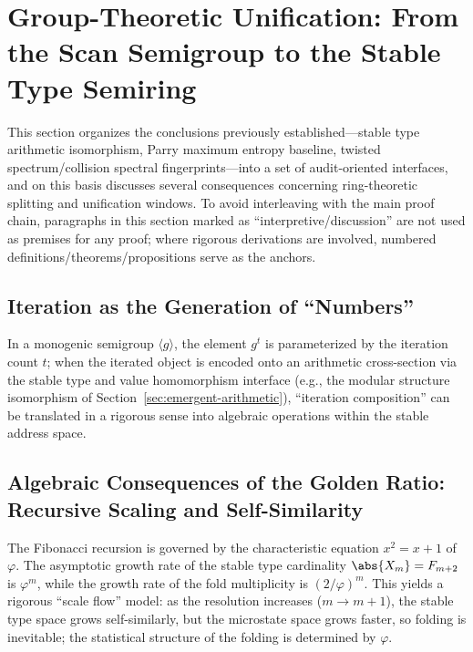 \section{Group-Theoretic Unification: From the Scan Semigroup to the Stable Type Semiring}\label{sec:group-unification}

This section organizes the conclusions previously established---stable type arithmetic isomorphism, Parry maximum entropy baseline, twisted spectrum/collision spectral fingerprints---into a set of audit-oriented interfaces, and on this basis discusses several consequences concerning ring-theoretic splitting and unification windows. To avoid interleaving with the main proof chain, paragraphs in this section marked as ``interpretive/discussion'' are not used as premises for any proof; where rigorous derivations are involved, numbered definitions/theorems/propositions serve as the anchors.

\subsection{Iteration as the Generation of ``Numbers''}

In a monogenic semigroup \(\langle g\rangle\), the element \(g^t\) is parameterized by the iteration count \(t\); when the iterated object is encoded onto an arithmetic cross-section via the stable type and value homomorphism interface (e.g., the modular structure isomorphism of Section~\ref{sec:emergent-arithmetic}), ``iteration composition'' can be translated in a rigorous sense into algebraic operations within the stable address space.

\subsection{Algebraic Consequences of the Golden Ratio: Recursive Scaling and Self-Similarity}

The Fibonacci recursion is governed by the characteristic equation $x^2=x+1$ of $\varphi$. The asymptotic growth rate of the stable type cardinality $\abs{X_m}=F_{m+2}$ is $\varphi^m$, while the growth rate of the fold multiplicity is $(2/\varphi)^m$. This yields a rigorous ``scale flow'' model: as the resolution increases ($m\to m+1$), the stable type space grows self-similarly, but the microstate space grows faster, so folding is inevitable; the statistical structure of the folding is determined by $\varphi$.

